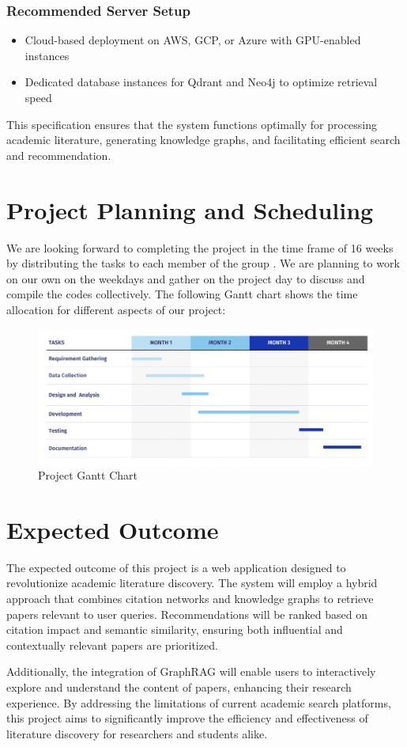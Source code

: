 \documentclass[a4paper,12pt]{article}
\begin{document}
\subsubsection{Recommended Server Setup}
\begin{itemize}
    \item Cloud-based deployment on AWS, GCP, or Azure with GPU-enabled instances
    \vspace{-10pt}
    \item Dedicated database instances for Qdrant and Neo4j to optimize retrieval speed
\end{itemize}
This specification ensures that the system functions optimally for processing academic
literature, generating knowledge graphs, and facilitating efficient search and
recommendation.
\newpage

\section{Project Planning and Scheduling}
We are looking forward to completing the project in the time frame of 16 weeks by
distributing the tasks to each member of the group . We are planning to work on our own
on the weekdays and gather on the project day to discuss and compile the codes
collectively. The following Gantt chart shows the time allocation for different aspects of
our project:
\begin{figure}[H]
    \centering
    \includegraphics[width=15cm]{ganttchart.png}
    \caption{Project Gantt Chart}
\end{figure}
\newpage

\section{Expected Outcome}
The expected outcome of this project is a web application designed to revolutionize
academic literature discovery. The system will employ a hybrid approach that combines
citation networks and knowledge graphs to retrieve papers relevant to user queries.
Recommendations will be ranked based on citation impact and semantic similarity,
ensuring both influential and contextually relevant papers are prioritized.

Additionally, the integration of GraphRAG will enable users to interactively
explore and understand the content of papers, enhancing their research experience.
By addressing the limitations of current academic search platforms, this project aims
to significantly improve the efficiency and effectiveness of literature discovery
for researchers and students alike.
\newpage

\printbibliography
\newpage
\end{document}
